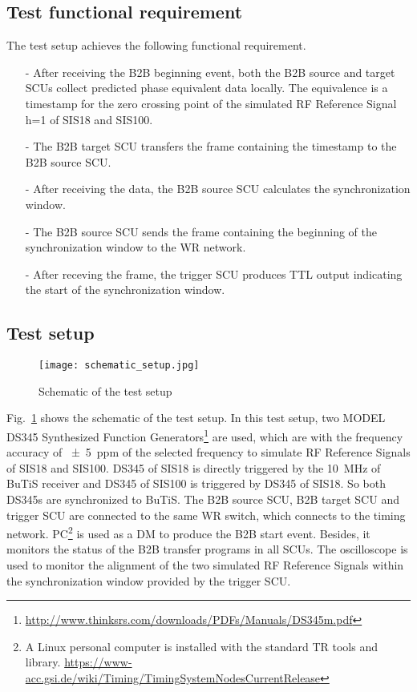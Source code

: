 \subsection{Test functional requirement}
The test setup achieves the following functional requirement.
\begin{itemize}
\item[-] After receiving the B2B beginning event, both the B2B source and target SCUs collect predicted phase equivalent data locally. The equivalence is a timestamp for the zero crossing point of the simulated RF Reference Signal h=1 of SIS18 and SIS100. 
\item[-] The B2B target SCU transfers the frame containing the timestamp to the B2B source SCU.
\item[-] After receiving the data, the B2B source SCU calculates the synchronization window.
\item[-] The B2B source SCU sends the frame containing the beginning of the synchronization window to the WR network.
\item[-] After receving the frame, the trigger SCU produces TTL output indicating the start of the synchronization window. 
\end{itemize}

\subsection{Test setup}

\begin{figure}[H]
   \centering   
   \texttt{[image: schematic\_setup.jpg]}
   \caption{Schematic of the test setup}
   \label{setup}
\end{figure}

Fig.~\ref{setup} shows the schematic of the test setup. In this test setup, two MODEL DS345 Synthesized Function Generators\footnote{\url{http://www.thinksrs.com/downloads/PDFs/Manuals/DS345m.pdf}} are used, which are with the frequency accuracy of \SI{+-5}{ppm} of the selected frequency to simulate RF Reference Signals of SIS18 and SIS100. DS345 of SIS18 is directly triggered by the \SI{10}{\MHz} of \gls{BuTiS} receiver and DS345 of SIS100 is triggered by DS345 of SIS18. So both DS345s are synchronized to BuTiS. The B2B source SCU, B2B target SCU and trigger SCU are connected to the same WR switch, which connects to the timing network. \gls{PC}\footnote{A Linux personal computer is installed with the standard TR tools and library. \newline\url{https://www-acc.gsi.de/wiki/Timing/TimingSystemNodesCurrentRelease}} is used as a DM to produce the B2B start event. Besides, it monitors the status of the  B2B transfer programs in all SCUs. The oscilloscope is used to monitor the alignment of the two simulated RF Reference Signals within the synchronization window provided by the trigger SCU.   

